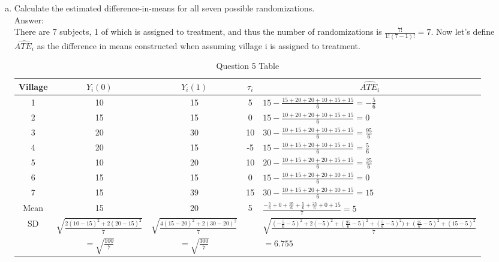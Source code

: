 \documentclass[11pt,notitlepage]{article}\usepackage[]{graphicx}\usepackage[]{color}
\begin{document}
\begin{enumerate}[a)]
\item Calculate the estimated difference-in-means for all seven possible randomizations.\\
Answer:\\
There are 7 subjects, 1 of which is assigned to treatment, and thus the number of randomizations is $\frac{7!}{1!(7-1)!}=7$. Now let's define $\widehat{ATE_{i}}$ as the difference in means constructed when assuming village i is assigned to treatment.

\begin{table}[htbp]
  \centering
  \caption{Question 5 Table}
    \begin{tabular}{cccc|l}
    \toprule
     Village & $Y_i(0)$       & $Y_i(1)$    & $\tau_i$        & \multicolumn{1}{c}{$\widehat{ATE_{i}}$} \\
    \midrule
    1     &  10     &  15     & 5      &  $15 - \frac{15+20+20+10+15+15}{6} = -\frac{5}{6}$\\
    2     &  15    &  15     &  0     &  $15 - \frac{10+20+20+10+15+15}{6} = 0$ \\
    3     &  20     & 30      &  10     &  $30 - \frac{10+15+20+10+15+15}{6} = \frac{95}{6}$\\
    4     &   20    &   15    &   -5    &  $15 - \frac{10+15+20+10+15+15}{6} = \frac{5}{6}$\\
    5     &  10      &  20     &  10     &  $20 - \frac{10+15+20+20+15+15}{6} = \frac{25}{6}$\\
    6     & 15      &   15    &   0    & $15 - \frac{10+15+20+20+10+15}{6} = 0$ \\
    7     &   15    &   39    &   15    &  $30 - \frac{10+15+20+20+10+15}{6} = 15$ \\ \midrule
    Mean  &   15    &   20    &   5    & $\frac{-\frac{5}{6} + 0 + \frac{95}{6} + \frac{5}{6} + \frac{25}{6} + 0 + 15}{7} = 5$ \\
    SD    & $\sqrt{\frac{2(10-15)^{2} + 2(20-15)^{2}}{7}}$      &  $\sqrt{\frac{4(15-20)^{2} + 2(30-20)^{2}}{7}}$      &       & $\sqrt{\frac{(-\frac{5}{6}-5)^{2} + 2(-5)^{2} + (\frac{95}{6}-5)^{2} + (\frac{5}{6}-5)^{2}) + (\frac{25}{6}-5)^{2} + (15-5)^{2}}{7}}$ \\
    & $= \sqrt{\frac{100}{7}}$ & $= \sqrt{\frac{300}{7}}$ & &  $= 6.755$\\
    \bottomrule
    \end{tabular}%
  \label{tab:addlabel}%
\end{table}%


\end{enumerate}
\end{document}
